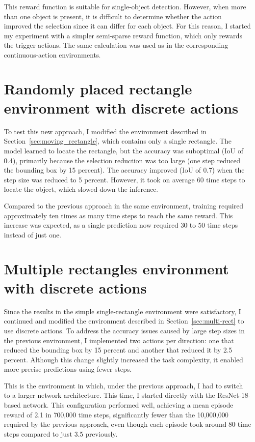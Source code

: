 \documentclass[
  digital,     %
  oneside,     %
  nosansbold,  %
  nocolorbold, %
  lof,         %
  lot,         %
]{fithesis4}
\begin{document}
This reward function is suitable for single-object detection. However, when more than one object is present, it is difficult to determine whether the action improved the selection since it can differ for each object. For this reason, I started my experiment with a simpler semi-sparse reward function, which only rewards the trigger actions. The same calculation was used as in the corresponding continuous-action environments.

\section{Randomly placed rectangle environment with discrete actions}

To test this new approach, I modified the environment described in Section~\ref{sec:moving_rectangle}, which contains only a single rectangle. The model learned to locate the rectangle, but the accuracy was suboptimal (IoU of 0.4), primarily because the selection reduction was too large (one step reduced the bounding box by 15 percent). The accuracy improved (IoU of 0.7) when the step size was reduced to 5 percent. However, it took on average 60 time steps to locate the object, which slowed down the inference.

Compared to the previous approach in the same environment, training required approximately ten times as many time steps to reach the same reward. This increase was expected, as a single prediction now required 30 to 50 time steps instead of just one.

\section{Multiple rectangles environment with discrete actions}

Since the results in the simple single-rectangle environment were satisfactory, I continued and modified the environment described in Section~\ref{sec:multi-rect} to use discrete actions. To address the accuracy issues caused by large step sizes in the previous environment, I implemented two actions per direction: one that reduced the bounding box by 15 percent and another that reduced it by 2.5 percent. Although this change slightly increased the task complexity, it enabled more precise predictions using fewer steps.

This is the environment in which, under the previous approach, I had to switch to a larger network architecture. This time, I started directly with the ResNet-18-based network. This configuration performed well, achieving a mean episode reward of 2.1 in 700,000 time steps, significantly fewer than the 10,000,000 required by the previous approach, even though each episode took around 80 time steps compared to just 3.5 previously.
\end{document}
